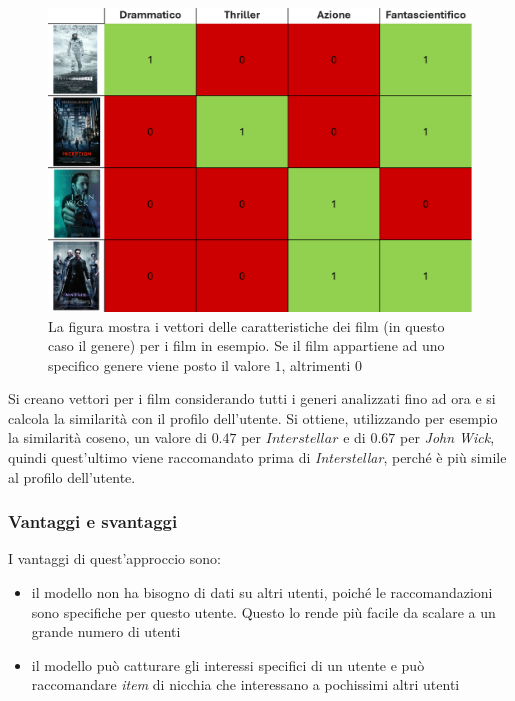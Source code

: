 \begin{figure}[H]
    \centering
    \includegraphics[scale=0.5]{figures/content_based_filtering.PNG}
    \caption{La figura mostra i vettori delle caratteristiche dei film (in questo caso il genere) per i film in esempio. Se il film appartiene ad uno specifico genere viene posto il valore $1$, altrimenti $0$}
    \label{fig:item_vector}
\end{figure}

Si creano vettori per i film considerando tutti i generi analizzati fino ad ora e si calcola la similarità con il profilo dell'utente. Si ottiene, utilizzando per esempio la similarità coseno, un valore di $0.47$ per $Interstellar$ e di $0.67$ per \textit{John Wick}, quindi quest'ultimo viene raccomandato prima di \textit{Interstellar}, perché è più simile al profilo dell'utente.


\subsubsection{Vantaggi e svantaggi}

I vantaggi di quest'approccio sono:
\begin{itemize}
    \item il modello non ha bisogno di dati su altri utenti, poiché le raccomandazioni sono specifiche per questo utente. Questo lo rende più facile da scalare a un grande numero di utenti
    \item il modello può catturare gli interessi specifici di un utente e può raccomandare \textit{item} di nicchia che interessano a pochissimi altri utenti
\end{itemize}

